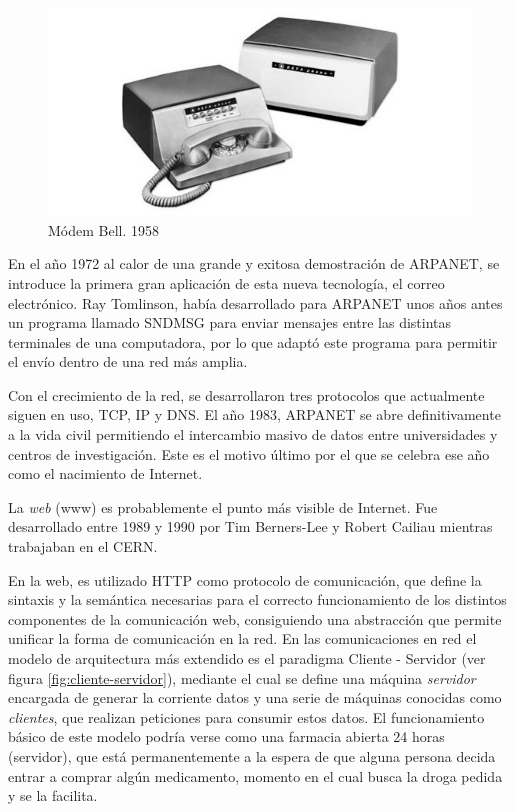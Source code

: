 \begin{figure}[hbtp]
\centering
\includegraphics[scale=0.5, fbox={\fboxrule} 4mm]{images/03-antecedentes/09-modem_bell.jpg}
\caption{Módem Bell. 1958}
\label{fig:bell_modem}
\end{figure}

En el año 1972 al calor de una grande y exitosa demostración de \ac{ARPANET}, se introduce la primera gran aplicación de esta nueva tecnología, el correo electrónico. Ray Tomlinson, había desarrollado para \ac{ARPANET} unos años antes un programa llamado SNDMSG para enviar mensajes entre las distintas terminales de una computadora, por lo que adaptó este programa para permitir el envío dentro de una red más amplia.

Con el crecimiento de la red, se desarrollaron tres protocolos que actualmente siguen en uso, \ac{TCP}, \ac{IP} y \ac{DNS}. El año 1983, \ac{ARPANET} se abre definitivamente a la vida civil permitiendo el intercambio masivo de datos entre universidades y centros de investigación. Este es el motivo último por el que se celebra ese año como el nacimiento de Internet.

La \textit{web} (\ac{www}) es probablemente el punto más visible de Internet. Fue desarrollado entre 1989 y 1990 por Tim Berners-Lee y Robert Cailiau mientras trabajaban en el \ac{CERN}.

En la web, es utilizado \ac{HTTP} como protocolo de comunicación, que define la sintaxis y la semántica necesarias para el correcto funcionamiento de los distintos componentes de la comunicación web, consiguiendo una abstracción que permite unificar la forma de comunicación en la red. En las comunicaciones en red el modelo de arquitectura más extendido es el paradigma Cliente - Servidor (ver figura \ref{fig:cliente-servidor}), mediante el cual se define una máquina \textit{servidor} encargada de generar la corriente datos y una serie de máquinas conocidas como \textit{clientes}, que realizan peticiones para consumir estos datos. El funcionamiento básico de este modelo podría verse como una farmacia abierta 24 horas (servidor), que está permanentemente a la espera de que alguna persona decida entrar a comprar algún medicamento, momento en el cual busca la droga pedida y se la facilita.

